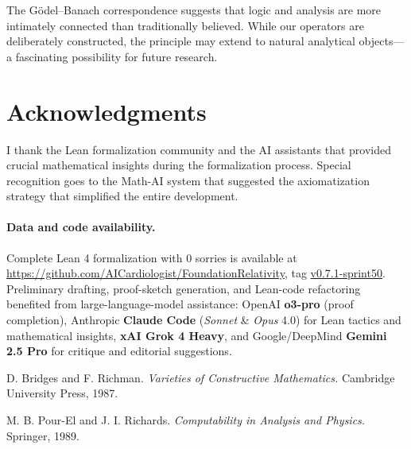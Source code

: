 \documentclass[11pt]{article}
\newcommand{\leanRepoTag}{%
  \href{https://github.com/AICardiologist/FoundationRelativity/tree/v0.7.1-sprint50}%
       {v0.7.1-sprint50}}
\newcommand{\llmNote}{%
  Preliminary drafting, proof-sketch generation, and Lean-code
  refactoring benefited from large-language-model assistance:
  OpenAI \textbf{o3-pro} (proof completion),
  Anthropic \textbf{Claude Code} (\emph{Sonnet} \& \emph{Opus} 4.0) for Lean tactics and mathematical insights,
  \textbf{xAI Grok 4 Heavy}, and Google/DeepMind \textbf{Gemini 2.5 Pro}
  for critique and editorial suggestions.
}
\theoremstyle{definition}
\begin{document}
The Gödel--Banach correspondence suggests that logic and analysis are more intimately connected than traditionally believed. While our operators are deliberately constructed, the principle may extend to natural analytical objects---a fascinating possibility for future research.

\section*{Acknowledgments}

I thank the Lean formalization community and the AI assistants that provided crucial mathematical insights during the formalization process. Special recognition goes to the Math-AI system that suggested the axiomatization strategy that simplified the entire development.

\paragraph{Data and code availability.}
Complete Lean 4 formalization with 0 sorries is available at
\url{https://github.com/AICardiologist/FoundationRelativity}, tag \leanRepoTag.
\llmNote


\begin{thebibliography}{BR87}

D. Bridges and F. Richman. \emph{Varieties of Constructive Mathematics.} Cambridge University Press, 1987.

M. B. Pour-El and J. I. Richards. \emph{Computability in Analysis and Physics.} Springer, 1989.


\end{thebibliography}
\end{document}

